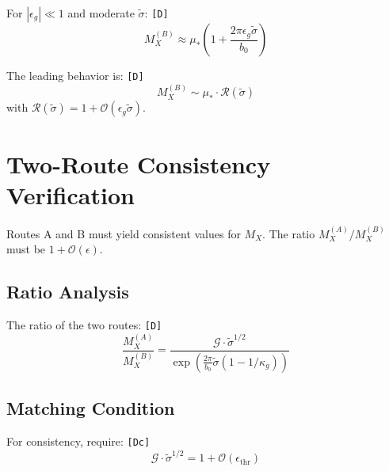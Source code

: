 \documentclass[11pt,a4paper]{article}
\newcommand{\tagD}{\textcolor{green!50!black}{\texttt{[D]}}}
\newcommand{\tagDc}{\textcolor{blue!70!black}{\texttt{[Dc]}}}
\theoremstyle{definition}
\begin{document}
For $|\epsilon_g| \ll 1$ and moderate $\tilde{\sigma}$: \tagD{}
\begin{equation}
\label{eq:mx-route-b-approx}
M_X^{(B)} \approx \mu_* \left(1 + \frac{2\pi \epsilon_g \tilde{\sigma}}{b_0}\right)
\end{equation}

The leading behavior is: \tagD{}
\begin{equation}
\label{eq:mx-route-b-leading}
M_X^{(B)} \sim \mu_* \cdot \mathcal{R}(\tilde{\sigma})
\end{equation}
with $\mathcal{R}(\tilde{\sigma}) = 1 + \mathcal{O}(\epsilon_g \tilde{\sigma})$.

\section{Two-Route Consistency Verification}
\label{sec:consistency}

\begin{consistencybox}
Routes A and B must yield consistent values for $M_X$.
The ratio $M_X^{(A)}/M_X^{(B)}$ must be $1 + \mathcal{O}(\epsilon)$.
\end{consistencybox}

\subsection{Ratio Analysis}
\label{subsec:ratio-analysis}

The ratio of the two routes: \tagD{}
\begin{equation}
\label{eq:route-ratio}
\frac{M_X^{(A)}}{M_X^{(B)}} = \frac{\mathcal{G} \cdot \tilde{\sigma}^{1/2}}{\exp\left(\frac{2\pi}{b_0} \tilde{\sigma}(1 - 1/\kappa_g)\right)}
\end{equation}

\subsection{Matching Condition}
\label{subsec:matching-condition}

For consistency, require: \tagDc{}
\begin{equation}
\label{eq:consistency-requirement}
\mathcal{G} \cdot \tilde{\sigma}^{1/2} = 1 + \mathcal{O}(\epsilon_{\text{thr}})
\end{equation}
\end{document}
